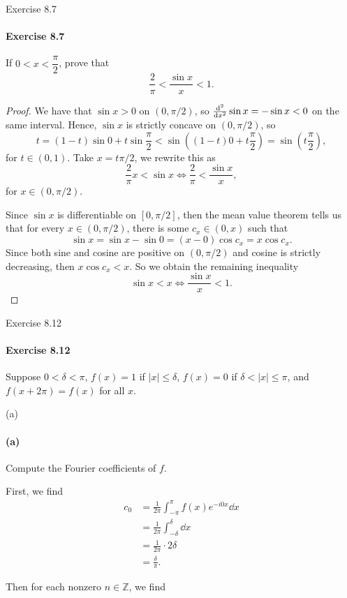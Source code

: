 \documentclass[12pt]{article}
\newenvironment{fullbox}{\begin{lrbox}{\savefullbox}\begin{minipage}{\dimexpr\textwidth-2\fboxsep\relax}}{\end{minipage}\end{lrbox}\begin{center}\framebox[\textwidth]{\usebox{\savefullbox}}\end{center}}
\newenvironment{pbox}[1][]{\begin{fullbox}\ifx#1\empty\else\paragraph{#1}\fi}{\end{fullbox}}
\theoremstyle{definition}
\newcommand{\Z}{\mathbb{Z}}
\begin{document}
\thispagestyle{title}

\begin{pbox}[Exercise 8.7]
    If $0 < x < \dfrac{\pi}{2}$, prove that
    \[
        \frac{2}{\pi} < \frac{\sin x}{x} < 1.
    \]
\end{pbox}

\begin{proof}
    We have that $\sin x > 0$ on $(0, \pi/2)$, so $\dv[2]{x} \sin x = -\sin x < 0$ on the same interval. Hence, $\sin x$ is strictly concave on $(0, \pi/2)$, so
    \[
        t = (1-t)\sin 0 + t\sin\frac{\pi}{2}
            < \sin((1-t)0 + t\frac{\pi}{2})
            = \sin(t\frac{\pi}{2}),
    \]
    for $t \in (0, 1)$. Take $x = t\pi/2$, we rewrite this as
    \[
        \frac{2}{\pi}x < \sin x \iff \frac{2}{\pi} < \frac{\sin x}{x},
    \]
    for $x \in (0, \pi/2)$.

    Since $\sin x$ is differentiable on $[0, \pi/2]$, then the mean value theorem tells us that for every $x \in (0, \pi/2)$, there is some $c_x \in (0, x)$ such that
    \[
        \sin x = \sin x - \sin 0 = (x - 0)\cos c_x = x \cos c_x.
    \]
    Since both sine and cosine are positive on $(0, \pi/2)$ and cosine is strictly decreasing, then $x\cos c_x < x$. So we obtain the remaining inequality
    \[
        \sin x < x \iff \frac{\sin x}{x} < 1.
    \]
    

\end{proof}



\newpage
\begin{pbox}[Exercise 8.12]
    Suppose $0 < \delta < \pi$, $f(x) = 1$ if $|x| \leq \delta$, $f(x) = 0$ if $\delta < |x| \leq \pi$, and $f(x + 2\pi) = f(x)$ for all $x$.
\end{pbox}

\begin{pbox}[(a)]
    Compute the Fourier coefficients of $f$.
\end{pbox}

First, we find
\begin{align*}
    c_0 &= \frac{1}{2\pi} \int_{-\pi}^{\pi} f(x)e^{-i0x} \dd{x} \\
        &= \frac{1}{2\pi} \int_{-\delta}^{\delta} \dd{x} \\
        &= \frac{1}{2\pi} \cdot 2\delta \\
        &= \frac{\delta}{\pi}.
\end{align*}


Then for each nonzero $n \in \Z$, we find
\end{document}
